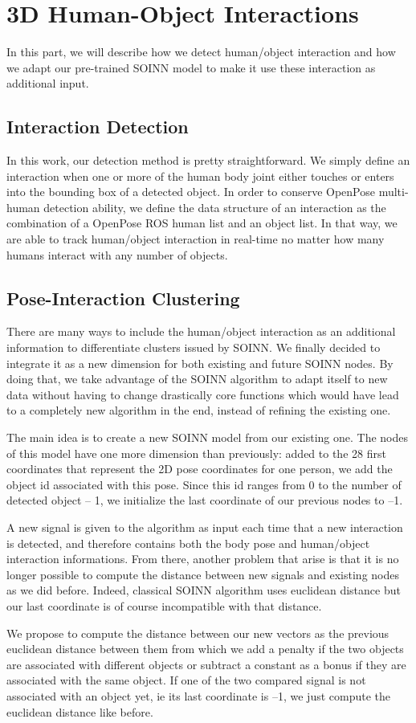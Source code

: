\section{3D Human-Object Interactions}
In this part, we will describe how we detect human/object interaction and how we adapt our pre-trained SOINN model to make it use these interaction as additional input.

\subsection{Interaction Detection}
In this work, our detection method is pretty straightforward. We simply define an interaction when one or more of the human body joint either touches or enters into the bounding box of a detected object. In order to conserve OpenPose multi-human detection ability, we define the data structure of an interaction as the combination of a OpenPose ROS human list and an object list. In that way, we are able to track human/object interaction in real-time no matter how many humans interact with any number of objects.

\subsection{Pose-Interaction Clustering}
\label{section:pose-interaction_clustering}
There are many ways to include the human/object interaction as an additional information to differentiate clusters issued by SOINN. We finally decided to integrate it as a new dimension for both existing and future SOINN nodes. By doing that, we take advantage of the SOINN algorithm to adapt itself to new data without having to change drastically core functions which would have lead to a completely new algorithm in the end, instead of refining the existing one.

The main idea is to create a new SOINN model from our existing one. The nodes of this model have one more dimension than previously: added to the 28 first coordinates that represent the 2D pose coordinates for one person, we add the object id associated with this pose. Since this id ranges from 0 to the number of detected object -- 1, we initialize the last coordinate of our previous nodes to --1. 

A new signal is given to the algorithm as input each time that a new interaction is detected, and therefore contains both the body pose and human/object interaction informations. From there, another problem that arise is that it is no longer possible to compute the distance between new signals and existing nodes as we did before. Indeed, classical SOINN algorithm uses euclidean distance but our last coordinate is of course incompatible with that distance. 

We propose to compute the distance between our new vectors as the previous euclidean distance between them from which we add a penalty if the two objects are associated with different objects or subtract a constant as a bonus if they are associated with the same object. If one of the two compared signal is not associated with an object yet, ie its last coordinate is --1, we just compute the euclidean distance like before.